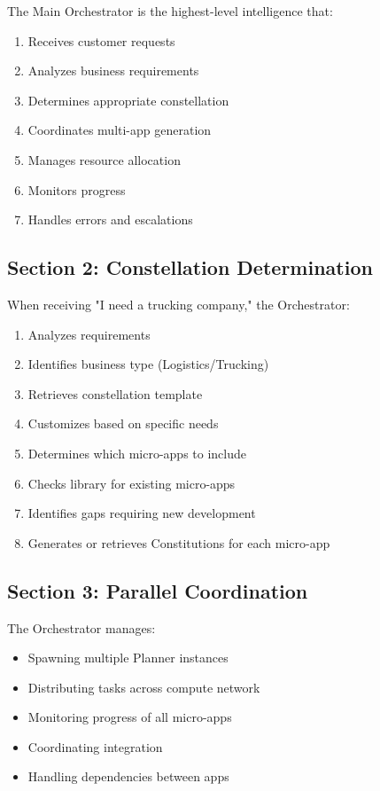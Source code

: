 \documentclass[12pt,letterpaper]{article}
\begin{document}
The Main Orchestrator is the highest-level intelligence that:

\begin{enumerate}
    \item Receives customer requests
    \item Analyzes business requirements
    \item Determines appropriate constellation
    \item Coordinates multi-app generation
    \item Manages resource allocation
    \item Monitors progress
    \item Handles errors and escalations
\end{enumerate}

\subsection{Section 2: Constellation Determination}

When receiving "I need a trucking company," the Orchestrator:

\begin{enumerate}
    \item Analyzes requirements
    \item Identifies business type (Logistics/Trucking)
    \item Retrieves constellation template
    \item Customizes based on specific needs
    \item Determines which micro-apps to include
    \item Checks library for existing micro-apps
    \item Identifies gaps requiring new development
    \item Generates or retrieves Constitutions for each micro-app
\end{enumerate}

\subsection{Section 3: Parallel Coordination}

The Orchestrator manages:

\begin{itemize}
    \item Spawning multiple Planner instances
    \item Distributing tasks across compute network
    \item Monitoring progress of all micro-apps
    \item Coordinating integration
    \item Handling dependencies between apps
\end{itemize}
\end{document}
